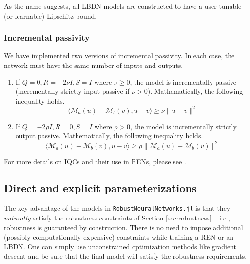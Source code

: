 As the name suggests, all LBDN models are constructed to have a user-tunable (or learnable) Lipschitz bound.

\subsubsection{Incremental passivity} 
We have implemented two versions of incremental passivity. In each case, the network must have the same number of inputs and outputs.

\begin{enumerate}
    \item If $Q = 0, R = -2\nu I, S = I$ where $\nu \ge 0$, the model is incrementally passive (incrementally strictly input passive if $\nu > 0$). Mathematically, the following inequality holds.
    \begin{equation}
    \langle \mathcal{M}_a(u) - \mathcal{M}_b(v), u-v \rangle \ge \nu \| u-v\|^2
    \end{equation}
    \item If $Q = -2\rho I, R = 0, S = I$ where $\rho > 0$, the model is incrementally strictly output passive. Mathematically, the following inequality holds.
    \begin{equation}
    \langle \mathcal{M}_a(u) - \mathcal{M}_b(v), u-v \rangle \ge \rho \| \mathcal{M}_a(u) - \mathcal{M}_b(v)\|^2
    \end{equation}
\end{enumerate}

For more details on IQCs and their use in RENs, please see \cite{Revay++2023}.

\subsection{Direct and explicit parameterizations} \label{sec:parameterizations}

The key advantage of the models in \verb|RobustNeuralNetworks.jl| is that they \textit{naturally} satisfy the robustness constraints of Section \ref{sec:robustness} -- i.e., robustness is guaranteed by construction. There is no need to impose additional (possibly computationally-expensive) constraints while training a REN or an LBDN. One can simply use unconstrained optimization methods like gradient descent and be sure that the final model will satisfy the robustness requirements.

